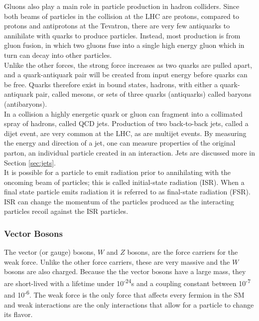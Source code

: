 	Gluons also play a main role in particle production in hadron colliders.  Since both beams of particles in the collision at the LHC are protons, compared to protons and antiprotons at the Tevatron, there are very few antiquarks to annihilate with quarks to produce particles.  Instead, most production is from gluon fusion, in which two gluons fuse into a single high energy gluon which in turn can decay into other particles. \\%
	
	Unlike the other forces, the strong force increases as two quarks are pulled apart, and a quark-antiquark pair will be created from input energy before quarks can be free.  Quarks therefore exist in bound states, hadrons, with either a quark-antiquark pair, called mesons, or sets of three quarks (antiquarks) called baryons (antibaryons).  \\
	
	In a collision a highly energetic quark or gluon can fragment into a collimated spray of hadrons, called QCD jets.  Production of two back-to-back jets, called a dijet event, are very common at the LHC, as are multijet events.  By measuring the energy and direction of a jet, one can measure properties of the original parton, an individual particle created in an interaction.  Jets are discussed more in Section \ref{sec:jets}.  \\
	
	It is possible for a particle to emit radiation prior to annihilating with the oncoming beam of particles; this is called initial-state radiation (ISR).  When a final state particle emits radiation it is referred to as final-state radiation (FSR).  ISR can change the momentum of the particles produced as the interacting particles recoil against the ISR particles.   \\
	
	
	\subsubsection{Vector Bosons}
	
	The vector (or gauge) bosons, $W$ and $Z$ bosons, are the force carriers for the weak force.  Unlike the other force carriers, these are very massive and the $W$ bosons are also charged.  Because the the vector bosons have a large mass, they are short-lived with a lifetime under 10\textsuperscript{-24}s and a coupling constant between 10\textsuperscript{-7} and 10\textsuperscript{-6}.  The weak force is the only force that affects every fermion in the SM and weak interactions are the only interactions that allow for a particle to change its flavor.  \\ %
	
